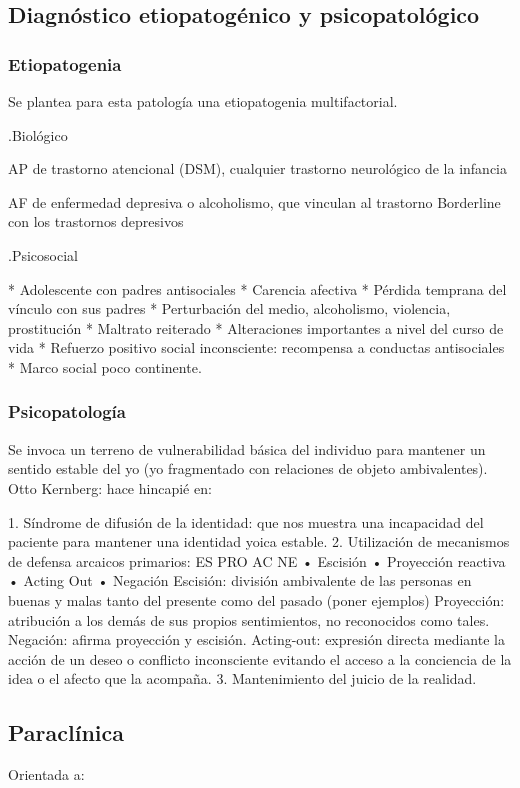 \subsection*{Diagnóstico etiopatogénico y psicopatológico}
\subsubsection*{Etiopatogenia}
Se plantea para esta patología una etiopatogenia multifactorial.

.Biológico

AP de trastorno atencional (DSM), cualquier trastorno neurológico de la infancia

AF de enfermedad depresiva o alcoholismo, que vinculan al trastorno Borderline con los trastornos depresivos

.Psicosocial

* Adolescente con padres antisociales
* Carencia afectiva
* Pérdida temprana del vínculo con sus padres
* Perturbación del medio, alcoholismo, violencia, prostitución
* Maltrato reiterado
* Alteraciones importantes a nivel del curso de vida
* Refuerzo positivo social inconsciente: recompensa a conductas antisociales
* Marco social poco continente.
\subsubsection*{Psicopatología}
Se invoca un terreno de vulnerabilidad básica del individuo para mantener un sentido estable del yo (yo fragmentado con relaciones de objeto ambivalentes). Otto Kernberg: hace hincapié en:

1. Síndrome de difusión de la identidad: que nos muestra una incapacidad del paciente para mantener una identidad yoica estable.
2. Utilización de mecanismos de defensa arcaicos primarios: ES PRO AC NE • Escisión • Proyección reactiva • Acting Out • Negación Escisión: división ambivalente de las personas en buenas y malas tanto del presente como del pasado (poner ejemplos) Proyección: atribución a los demás de sus propios sentimientos, no reconocidos como tales. Negación: afirma proyección y escisión. Acting-out: expresión directa mediante la acción de un deseo o conflicto inconsciente evitando el acceso a la conciencia de la idea o el afecto que la acompaña.
3. Mantenimiento del juicio de la realidad.
\subsection*{Paraclínica}
Orientada a:


